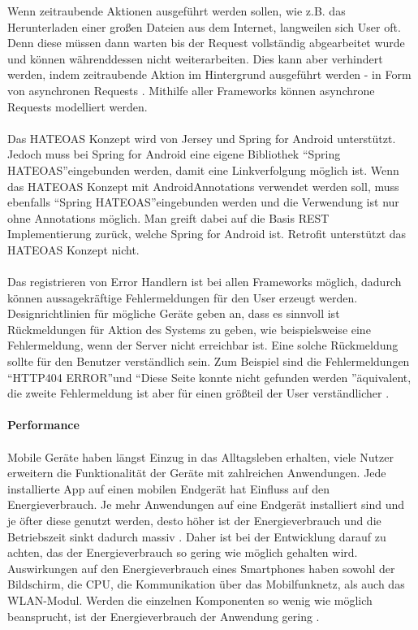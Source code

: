 Wenn zeitraubende Aktionen ausgeführt werden sollen, wie z.B. das Herunterladen einer großen Dateien aus dem Internet, langweilen sich User oft. Denn diese müssen dann warten bis der Request vollständig abgearbeitet wurde und können währenddessen nicht weiterarbeiten. Dies kann aber verhindert werden, indem zeitraubende Aktion im Hintergrund ausgeführt werden - in Form von asynchronen Requests \cite{louis:android}. Mithilfe aller Frameworks können asynchrone Requests modelliert werden. 
\\\\
Das HATEOAS Konzept wird von Jersey und Spring for Android unterstützt. Jedoch muss bei Spring for Android eine eigene Bibliothek \textquotedblleft Spring HATEOAS\textquotedblright eingebunden werden, damit eine Linkverfolgung möglich ist. Wenn das HATEOAS Konzept mit AndroidAnnotations verwendet werden soll, muss ebenfalls \textquotedblleft Spring HATEOAS\textquotedblright eingebunden werden und die Verwendung ist nur ohne Annotations möglich. Man greift dabei auf die Basis REST Implementierung zurück, welche Spring for Android ist. Retrofit unterstützt das HATEOAS Konzept nicht.
\\\\
Das registrieren von Error Handlern ist bei allen Frameworks möglich, dadurch können aussagekräftige Fehlermeldungen für den User erzeugt werden. Designrichtlinien für mögliche Geräte geben an, dass es sinnvoll ist Rückmeldungen für Aktion des Systems zu geben, wie beispielsweise eine Fehlermeldung, wenn der Server nicht erreichbar ist. Eine solche Rückmeldung sollte für den Benutzer verständlich sein. Zum Beispiel sind die Fehlermeldungen \textquotedblleft HTTP404 ERROR\textquotedblright und \textquotedblleft Diese Seite konnte nicht gefunden werden \textquotedblright äquivalent, die zweite Fehlermeldung ist aber für einen größteil der User verständlicher \cite{gong2004guidelines}.
\\\\
{\large \textbf{Performance}}\\\\
Mobile Geräte haben längst Einzug in das Alltagsleben erhalten, viele Nutzer erweitern die Funktionalität der Geräte mit zahlreichen Anwendungen. Jede installierte App auf einen mobilen Endgerät hat Einfluss auf den Energieverbrauch. Je mehr Anwendungen auf eine Endgerät installiert sind und je öfter diese genutzt werden, desto höher ist der Energieverbrauch und die Betriebszeit sinkt dadurch massiv \cite{Wil2012}. Daher ist bei der Entwicklung darauf zu achten, das der Energieverbrauch so gering wie möglich gehalten wird. Auswirkungen auf den Energieverbrauch eines Smartphones haben sowohl der Bildschirm, die \acrfull{CPU}, die Kommunikation über das Mobilfunknetz, als auch das WLAN-Modul. Werden die einzelnen Komponenten so wenig wie möglich beansprucht, ist der Energieverbrauch der Anwendung gering \cite{vetter}. 
